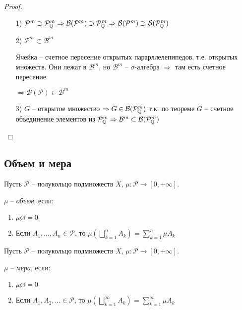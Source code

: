 \begin{proof}~
    \begin{enumerate}
        \item[1)] $\mathcal{P}^m\supset \mathcal{P}^m_{\mathbb{Q}}\Rightarrow \mathcal{B}(\mathcal{P}^m)\supset \mathcal{P}^m_{\mathbb{Q}}\Rightarrow \mathcal{B}(\mathcal{P}^m)\supset \mathcal{B}(\mathcal{P}^m_{\mathbb{Q}})$
        \item[2)] $\mathcal{P}^m \subset \mathcal{B}^m$

        Ячейка – счетное пересение открытых парарллелепипедов, т.е. открытых множеств.
        Они лежат в $\mathcal{B}^m$, но $\mathcal{B}^m$ – $\sigma$-алгебра $\Rightarrow$ там есть счетное пересение.
    
        $\Rightarrow \mathcal{B}(\mathcal{P})\subset \mathcal{B}^m$
        \item[3)] $G$ – открытое множество $\Rightarrow G\in \mathcal{B}(\mathcal{P}^m_{\mathbb{Q}})$ т.к. по теореме
        $G$ – счетное объединение элементов из $\mathcal{P}^m_{\mathbb{Q}}\Rightarrow \mathcal{B}^m\subset \mathcal{B}(\mathcal{P}^m_{\mathbb{Q}})$
    \end{enumerate}
\end{proof}

\subsection{Объем и мера}

\begin{definition}
    Пусть $\mathcal{P}$ – полукольцо подмножеств $X$, $\mu: \mathcal{P} \rightarrow [0, +\infty]$.

    $\mu$ – \textit{объем}, если:
    \begin{enumerate}
        \item $\mu \varnothing = 0$
        \item Если $A_1, ..., A_n \in \mathcal{P}$, то $\mu(\bigsqcup\limits_{k=1}^n A_k)=\sum \limits_{k=1}^n \mu A_k$
    \end{enumerate}
\end{definition}

\begin{definition}
    Пусть $\mathcal{P}$ – полукольцо подмножеств $X$, $\mu: \mathcal{P} \rightarrow [0, +\infty]$.

    $\mu$ – \textit{мера}, если:
    \begin{enumerate}
        \item $\mu \varnothing = 0$
        \item Если $A_1, A_2, ... \in \mathcal{P}$, то $\mu(\bigsqcup\limits_{k=1}^\infty A_k)=\sum \limits_{k=1}^\infty \mu A_k$
    \end{enumerate}
\end{definition}


